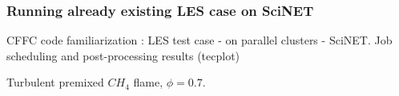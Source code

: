 \documentclass{beamer}
\begin{document}
\begin{frame}
\frametitle{Running already existing LES case on SciNET}
\scriptsize
CFFC code familiarization : LES test case - on parallel clusters - SciNET. Job scheduling and post-processing results (tecplot)
\begin{minipage}[t][1\textheight]{1\textwidth}
\vspace{-10pt}
\begin{exampleblock}{Turbulent premixed $CH_4$ flame, $\phi=0.7$. }
\vspace{-20pt}
\begin{figure}
\label{fig:LES}
\centering
{}

\end{figure}
\end{exampleblock}
\end{minipage}
\end{frame}
\end{document}
